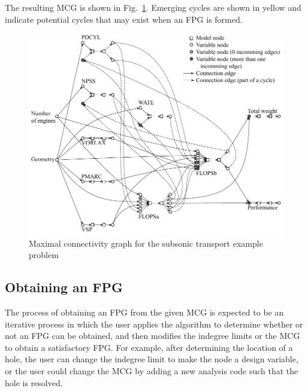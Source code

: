 	The resulting MCG is shown in Fig.~\ref{f:MCG}. 
	Emerging cycles are shown in yellow and indicate potential cycles that may exist when an FPG is formed.
	\begin{figure}[htb!]
	  \begin{center}
		\includegraphics[width=6in]{images/MCG_edit}
	  \end{center}
	  \caption{Maximal connectivity graph for the subsonic transport example problem}
	\label{f:MCG}
	\end{figure}

\subsection{Obtaining an FPG}
	\label{ss:obtaining an FPG}
	The process of obtaining an FPG from the given MCG is expected to be an iterative process in which the user applies the algorithm to determine whether or not an FPG can be obtained, 
	and then modifies the indegree limits or the MCG to obtain a satisfactory FPG. 
	For example, after determining the location of a hole, the user can change the indegree limit to make the node a design variable, or the user could change the MCG by adding a new analysis code such that the hole is resolved.

